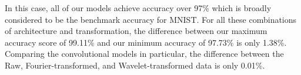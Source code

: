 In this case, all of our models achieve accuracy over 97\% which is broadly considered to be the benchmark accuracy for MNIST. 
For all these combinations of architecture and transformation, the difference between our maximum accuracy score of 99.11\% and our minimum accuracy of 97.73\% is only 1.38\%.
Comparing the convolutional models in particular, the difference between the Raw, Fourier-transformed, and Wavelet-transformed data is only 0.01\%. 